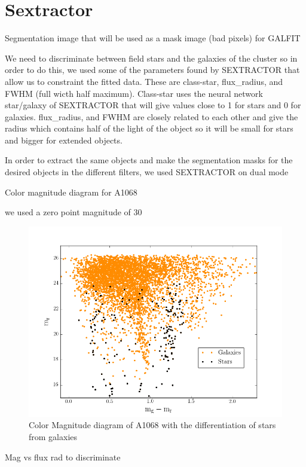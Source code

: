 \section{Sextractor}

Segmentation image that will be used as a mask image (bad pixels) for GALFIT

We need to discriminate between field stars and the galaxies of the cluster so in order to do this, we used some of the parameters found by SEXTRACTOR that allow us to constraint the fitted data. These are class-star, flux\_radius, and FWHM (full wicth half maximum). Class-star uses the neural network star/galaxy of SEXTRACTOR that will give values close to 1 for stars and 0 for galaxies. flux\_radius, and FWHM are closely related to each other and give the radius which contains half of the light of the object so it will be small for stars and bigger for extended objects.

In order to extract the same objects and make the segmentation masks for the desired objects in the different filters, we used SEXTRACTOR on dual mode

Color magnitude diagram for A1068

we used a zero point magnitude of 30

\begin{figure}[H]
\centering
\includegraphics[width=12cm]{images/color_mag.png}
\caption[Color Magnitude diagram of A1068]{Color Magnitude diagram of A1068 with the differentiation of stars from galaxies}
\end{figure}

Mag vs flux rad to discriminate

